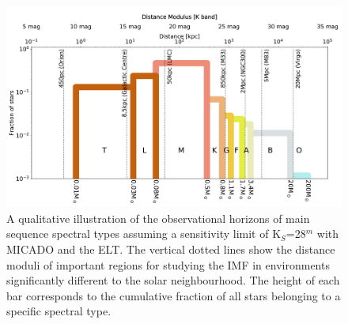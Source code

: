 \begin{figure}
    \centering
    \includegraphics[width=\textwidth]{images/imf_educational.pdf}
    \caption{A qualitative illustration of the observational horizons of main sequence spectral types assuming a sensitivity limit of K$_S$=28$^m$ with MICADO and the ELT. The vertical dotted lines show the distance moduli of important regions for studying the IMF in environments significantly different to the solar neighbourhood. The height of each bar corresponds to the cumulative fraction of all stars belonging to a specific spectral type.
    }
    \label{fig:imf_educational}
\end{figure}


